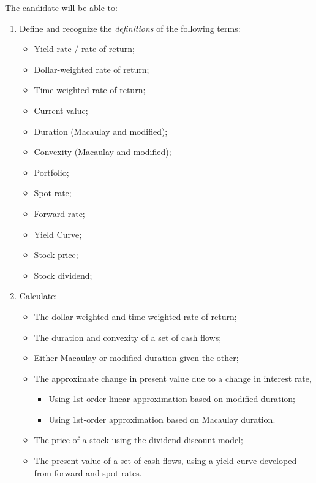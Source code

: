 \begin{outcomes}
The candidate will be able to:
\begin{enumerate}[label = \alph*), leftmargin = *]
	\item	Define and recognize the \textit{definitions} of the following terms:
		\begin{itemize}[leftmargin = *]
		\item	Yield rate / rate of return;
		\item	Dollar-weighted rate of return;
		\item	Time-weighted rate of return;
		\item	Current value;
		\item	Duration	 (Macaulay and modified);
		\item	Convexity (Macaulay and modified);
		\item	Portfolio;
		\item	Spot rate;
		\item	Forward rate;
		\item	Yield Curve;
		\item	Stock price;
		\item	Stock dividend;
		\end{itemize}
	\item	Calculate:
		\begin{itemize}[leftmargin = *]
		\item	The dollar-weighted and time-weighted rate of return;
		\item 	The duration and convexity of a set of cash flows;
		\item	Either Macaulay or modified duration given the other;
		\item	The approximate change in present value due to a change in interest rate,
			\begin{itemize}[leftmargin = *]
			\item	Using 1st-order linear approximation based on modified duration;
			\item	Using 1st-order approximation based on Macaulay duration.
			\end{itemize}
		\item	The price of a stock using the dividend discount model;
		\item	The present value of a set of cash flows, using a yield curve developed from forward and spot rates.
		\end{itemize}
\end{enumerate}
\end{outcomes}

